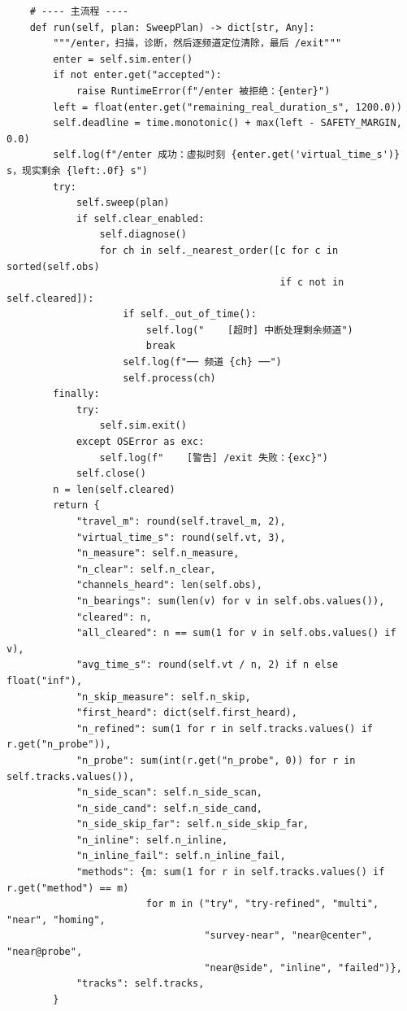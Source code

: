 \documentclass[UTF8, zihao=5,AutoFakeBold=2]{ctexart}
\begin{document}
\begin{lstlisting}
    # ---- 主流程 ----
    def run(self, plan: SweepPlan) -> dict[str, Any]:
        """/enter，扫描，诊断，然后逐频道定位清除，最后 /exit"""
        enter = self.sim.enter()
        if not enter.get("accepted"):
            raise RuntimeError(f"/enter 被拒绝：{enter}")
        left = float(enter.get("remaining_real_duration_s", 1200.0))
        self.deadline = time.monotonic() + max(left - SAFETY_MARGIN, 0.0)
        self.log(f"/enter 成功：虚拟时刻 {enter.get('virtual_time_s')} s，现实剩余 {left:.0f} s")
        try:
            self.sweep(plan)
            if self.clear_enabled:
                self.diagnose()
                for ch in self._nearest_order([c for c in sorted(self.obs)
                                               if c not in self.cleared]):
                    if self._out_of_time():
                        self.log("    [超时] 中断处理剩余频道")
                        break
                    self.log(f"── 频道 {ch} ──")
                    self.process(ch)
        finally:
            try:
                self.sim.exit()
            except OSError as exc:
                self.log(f"    [警告] /exit 失败：{exc}")
            self.close()
        n = len(self.cleared)
        return {
            "travel_m": round(self.travel_m, 2),
            "virtual_time_s": round(self.vt, 3),
            "n_measure": self.n_measure,
            "n_clear": self.n_clear,
            "channels_heard": len(self.obs),
            "n_bearings": sum(len(v) for v in self.obs.values()),
            "cleared": n,
            "all_cleared": n == sum(1 for v in self.obs.values() if v),
            "avg_time_s": round(self.vt / n, 2) if n else float("inf"),
            "n_skip_measure": self.n_skip,
            "first_heard": dict(self.first_heard),
            "n_refined": sum(1 for r in self.tracks.values() if r.get("n_probe")),
            "n_probe": sum(int(r.get("n_probe", 0)) for r in self.tracks.values()),
            "n_side_scan": self.n_side_scan,
            "n_side_cand": self.n_side_cand,
            "n_side_skip_far": self.n_side_skip_far,
            "n_inline": self.n_inline,
            "n_inline_fail": self.n_inline_fail,
            "methods": {m: sum(1 for r in self.tracks.values() if r.get("method") == m)
                        for m in ("try", "try-refined", "multi", "near", "homing",
                                  "survey-near", "near@center", "near@probe",
                                  "near@side", "inline", "failed")},
            "tracks": self.tracks,
        }
	\end{lstlisting}
\end{document}
